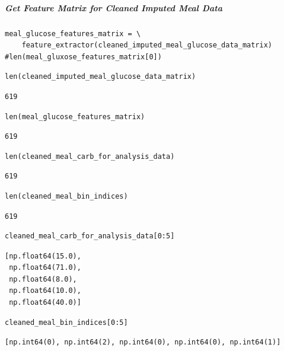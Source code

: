 \subparagraph{Get Feature Matrix for Cleaned Imputed Meal Data}

\begin{verbatim}
meal_glucose_features_matrix = \
    feature_extractor(cleaned_imputed_meal_glucose_data_matrix)
#len(meal_gluxose_features_matrix[0])
\end{verbatim}

\begin{verbatim}
len(cleaned_imputed_meal_glucose_data_matrix)
\end{verbatim}

\begin{verbatim}
619
\end{verbatim}

\begin{verbatim}
len(meal_glucose_features_matrix)
\end{verbatim}

\begin{verbatim}
619
\end{verbatim}

\begin{verbatim}
len(cleaned_meal_carb_for_analysis_data)
\end{verbatim}

\begin{verbatim}
619
\end{verbatim}

\begin{verbatim}
len(cleaned_meal_bin_indices)
\end{verbatim}

\begin{verbatim}
619
\end{verbatim}

\begin{verbatim}
cleaned_meal_carb_for_analysis_data[0:5]
\end{verbatim}

\begin{verbatim}
[np.float64(15.0),
 np.float64(71.0),
 np.float64(8.0),
 np.float64(10.0),
 np.float64(40.0)]
\end{verbatim}

\begin{verbatim}
cleaned_meal_bin_indices[0:5]
\end{verbatim}

\begin{verbatim}
[np.int64(0), np.int64(2), np.int64(0), np.int64(0), np.int64(1)]
\end{verbatim}

